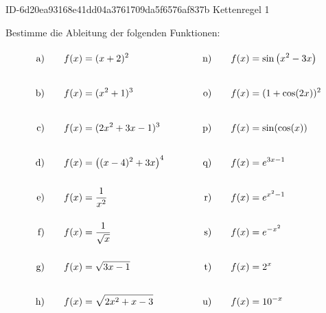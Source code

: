 \begin{exercise}
      {ID-6d20ea93168e41dd04a3761709da5f6576af837b}
      {Kettenregel 1}
  \ifproblem\problem\par
    Bestimme die Ableitung der folgenden Funktionen:
    \begingroup
      \newcommand{\vstrut}{\rule[-3.5ex]{0pt}{7.5ex}}%
      \newcommand{\xca}{f(x)&=(x+2)^{2}}%
      \newcommand{\xcb}{f(x)&=(x^{2}+1)^{3}}%
      \newcommand{\xcc}{f(x)&=(2x^{2}+3x-1)^{3}}%
      \newcommand{\xcd}{f(x)&=\left((x-4)^{2}+3x\right)^{4}}%
      \newcommand{\xce}{f(x)&=\frac{1}{x^{2}}}%
      \newcommand{\xcf}{f(x)&=\frac{1}{\sqrt{x}}}%
      \newcommand{\xcg}{f(x)&=\sqrt{3x-1}}%
      \newcommand{\xch}{f(x)&=\sqrt{2x^{2}+x-3}}%
      \newcommand{\xci}{f(x)&=\sqrt{x^{3}}}%
      \newcommand{\xcj}{f(x)&=\sqrt{\sqrt[3]{x}}}%
      \newcommand{\xck}{f(x)&=-\cos(5x)}%
      \newcommand{\xcl}{f(x)&=\sin\left(\frac{\pi}{2}-x\right)}%
      \newcommand{\xcm}{f(x)&=\cos\left(x^{3}+1\right)}%
      \newcommand{\xcn}{f(x)&=\sin\left(x^{2}-3x\right)}%
      \newcommand{\xco}{f(x)&=(1+\cos(2x))^{2}}%
      \newcommand{\xcp}{f(x)&=\sin(\cos(x))}%
      \newcommand{\xcq}{f(x)&=e^{3x-1}}%
      \newcommand{\xcr}{f(x)&=e^{x^{2}-1}}%
      \newcommand{\xcs}{f(x)&=e^{-x^{2}}}%
      \newcommand{\xct}{f(x)&=2^{x}}%
      \newcommand{\xcu}{f(x)&=10^{-x}}%
      \newcommand{\xcv}{f(x)&=k_{0}\cdot\left(1+\frac{p}{100}\right)^{x}}%
      \newcommand{\xcw}{f(x)&=\ln\left(x^{2}+3\right)}%
      \newcommand{\xcx}{f(x)&=\ln(\sin(x)+2)}%
      \newcommand{\xcy}{f(x)&=\log_{2}(3x+1)}%
      \newcommand{\xcz}{f(x)&=\ln(\ln(x))}%
      \allowdisplaybreaks
      \begin{alignat*}{5}
        \text{a)\vstrut}&\quad & \xca & \quad&\quad & \text{n)\vstrut}&\quad & \xcn \\
        \text{b)\vstrut}&\quad & \xcb & \quad&\quad & \text{o)\vstrut}&\quad & \xco \\
        \text{c)\vstrut}&\quad & \xcc & \quad&\quad & \text{p)\vstrut}&\quad & \xcp \\
        \text{d)\vstrut}&\quad & \xcd & \quad&\quad & \text{q)\vstrut}&\quad & \xcq \\
        \text{e)\vstrut}&\quad & \xce & \quad&\quad & \text{r)\vstrut}&\quad & \xcr \\
        \text{f)\vstrut}&\quad & \xcf & \quad&\quad & \text{s)\vstrut}&\quad & \xcs \\
        \text{g)\vstrut}&\quad & \xcg & \quad&\quad & \text{t)\vstrut}&\quad & \xct \\
        \text{h)\vstrut}&\quad & \xch & \quad&\quad & \text{u)\vstrut}&\quad & \xcu \\

\end{alignat*}
\end{exercise}
